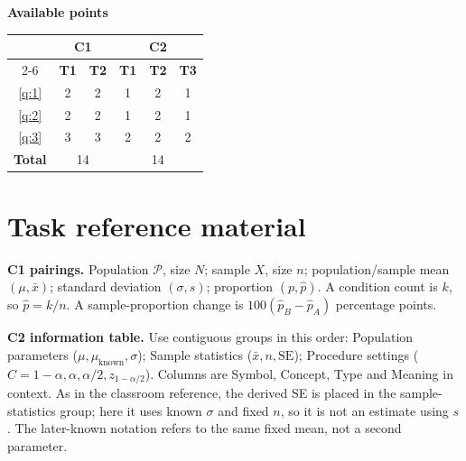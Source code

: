 \noindent\begin{minipage}{\linewidth}
	\centering
	\textbf{Available points}\par\smallskip
	
	\centering
	\begin{tabular}{|c||c|c||c|c|c|}
		\hline
		\multirow[c]{2}{*}{\textbf{\textnumero}} & \multicolumn{2}{c||}{\textbf{C1}}
		& \multicolumn{3}{c|}{\textbf{C2}}\\
		\cline{2-6}
		& \textbf{T1} & \textbf{T2}
		& \textbf{T1} & \textbf{T2} & \textbf{T3}\\
		\hline
		\ref*{q:1} & 2 & 2 & 1 & 2 & 1\\
		\hline
		\ref*{q:2} & 2 & 2 & 1 & 2 & 1\\
		\hline
		\ref*{q:3} & 3 & 3 & 2 & 2 & 2\\
		\hline
		\textbf{Total}
		& \multicolumn{2}{c||}{14}
		& \multicolumn{3}{c|}{14}\\
		\hline
	\end{tabular}
	
\end{minipage}\par

\clearpage
\section*{Task reference material}
\textbf{C1 pairings.} Population $\mathcal P$, size $N$; sample $X$, size $n$; population/sample mean $(\mu,\bar x)$; standard deviation $(\sigma,s)$; proportion $(p,\hat p)$. A condition count is $k$, so $\hat p=k/n$. A sample-proportion change is $100(\hat p_B-\hat p_A)$ percentage points.

\textbf{C2 information table.} Use contiguous groups in this order: Population parameters ($\mu,\mu_{\mathrm{known}},\sigma$); Sample statistics ($\bar x,n,\mathrm{SE}$); Procedure settings ($C=1-\alpha,\alpha,\alpha/2,z_{1-\alpha/2}$). Columns are Symbol, Concept, Type and Meaning in context. As in the classroom reference, the derived SE is placed in the sample-statistics group; here it uses known $\sigma$ and fixed $n$, so it is not an estimate using $s$. The later-known notation refers to the same fixed mean, not a second parameter.


